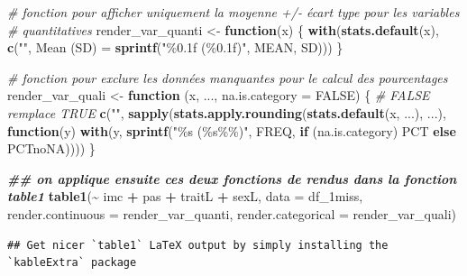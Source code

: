 \documentclass[
]{book}
\newenvironment{Shaded}{\begin{snugshade}}{\end{snugshade}}
\newcommand{\AttributeTok}[1]{\textcolor[rgb]{0.13,0.29,0.53}{#1}}
\newcommand{\CommentTok}[1]{\textcolor[rgb]{0.56,0.35,0.01}{\textit{#1}}}
\newcommand{\ConstantTok}[1]{\textcolor[rgb]{0.56,0.35,0.01}{#1}}
\newcommand{\ControlFlowTok}[1]{\textcolor[rgb]{0.13,0.29,0.53}{\textbf{#1}}}
\newcommand{\DocumentationTok}[1]{\textcolor[rgb]{0.56,0.35,0.01}{\textbf{\textit{#1}}}}
\newcommand{\FunctionTok}[1]{\textcolor[rgb]{0.13,0.29,0.53}{\textbf{#1}}}
\newcommand{\NormalTok}[1]{#1}
\newcommand{\OtherTok}[1]{\textcolor[rgb]{0.56,0.35,0.01}{#1}}
\newcommand{\SpecialCharTok}[1]{\textcolor[rgb]{0.81,0.36,0.00}{\textbf{#1}}}
\newcommand{\StringTok}[1]{\textcolor[rgb]{0.31,0.60,0.02}{#1}}
\begin{document}
\begin{Shaded}
\begin{Highlighting}[]
\CommentTok{\# fonction pour afficher uniquement la moyenne +/{-} écart type pour les variables}
\CommentTok{\# quantitatives}
\NormalTok{render\_var\_quanti }\OtherTok{\textless{}{-}} \ControlFlowTok{function}\NormalTok{(x) \{   }
  \FunctionTok{with}\NormalTok{(}\FunctionTok{stats.default}\NormalTok{(x), }
       \FunctionTok{c}\NormalTok{(}\StringTok{""}\NormalTok{, }
         \StringTok{\textasciigrave{}}\AttributeTok{Mean (SD)}\StringTok{\textasciigrave{}} \OtherTok{=} \FunctionTok{sprintf}\NormalTok{(}\StringTok{"\%0.1f (\%0.1f)"}\NormalTok{, MEAN, SD)))}
\NormalTok{\}}

\CommentTok{\# fonction pour exclure les données manquantes pour le calcul des pourcentages}
\NormalTok{render\_var\_quali }\OtherTok{\textless{}{-}} \ControlFlowTok{function}\NormalTok{ (x, ..., }\AttributeTok{na.is.category =} \ConstantTok{FALSE}\NormalTok{) \{ }\CommentTok{\# FALSE remplace TRUE}
    \FunctionTok{c}\NormalTok{(}\StringTok{""}\NormalTok{,}
      \FunctionTok{sapply}\NormalTok{(}\FunctionTok{stats.apply.rounding}\NormalTok{(}\FunctionTok{stats.default}\NormalTok{(x, ...), ...),}
             \ControlFlowTok{function}\NormalTok{(y) }\FunctionTok{with}\NormalTok{(y, }\FunctionTok{sprintf}\NormalTok{(}\StringTok{"\%s (\%s\%\%)"}\NormalTok{, FREQ,}
                                         \ControlFlowTok{if}\NormalTok{ (na.is.category) PCT }\ControlFlowTok{else}\NormalTok{ PCTnoNA)))) }
\NormalTok{\}}

\DocumentationTok{\#\# on applique ensuite ces deux fonctions de rendus dans la fonction table1}
\FunctionTok{table1}\NormalTok{(}\SpecialCharTok{\textasciitilde{}}\NormalTok{ imc }\SpecialCharTok{+}\NormalTok{ pas }\SpecialCharTok{+}\NormalTok{ traitL }\SpecialCharTok{+}\NormalTok{ sexL, }
       \AttributeTok{data =}\NormalTok{ df\_1miss, }
       \AttributeTok{render.continuous =}\NormalTok{ render\_var\_quanti, }
       \AttributeTok{render.categorical =}\NormalTok{ render\_var\_quali)}
\end{Highlighting}
\end{Shaded}

\begin{verbatim}
## Get nicer `table1` LaTeX output by simply installing the `kableExtra` package
\end{verbatim}
\end{document}
